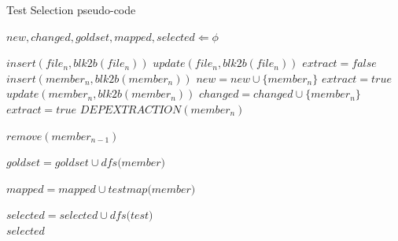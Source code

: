 \begin{algorithm}
{\fontsize{12pt}{12pt}\selectfont
\caption{Test Selection pseudo-code}
  \label{tldr}
  \begin{algorithmic}[1]
\State $new, changed, goldset, mapped, selected \Leftarrow \phi$

        \State $\textit{insert}(file_{n}, \textit{blk2b}(file_{n}))$
    \EndIf
      \State $\textit{update}(file_{n}, \textit{blk2b}(file_{n}))$
           \State $extract = false$
                \State $\textit{insert}(member_{n},  \textit{blk2b}(member_{n}))$
                \State $new = new \cup \{member_{n}\}$ 
                \State $extract = true$
                 \State $\textit{update}(member_{n}, \textit{blk2b}(member_{n}))$
                 \State $changed = changed \cup \{member_{n}\}$ 
                 \State $extract = true$
          \EndIf
                    \State $DEPEXTRACTION(member_{n})$
          \EndIf
          
               \State $remove(member_{n-1})$
            \EndFor    
            
       \EndFor
    \EndIf
\EndFor

        \State $goldset = goldset \cup \textit{dfs(member)}$ 
\EndFor

        \State $mapped = mapped \cup \textit{testmap(member)}$ 
\EndFor

        \State $selected = selected \cup \textit{dfs(test)}$ 
\EndFor\\
\Return ${selected}$
\EndFunction
\end{algorithmic}
}
\end{algorithm}




